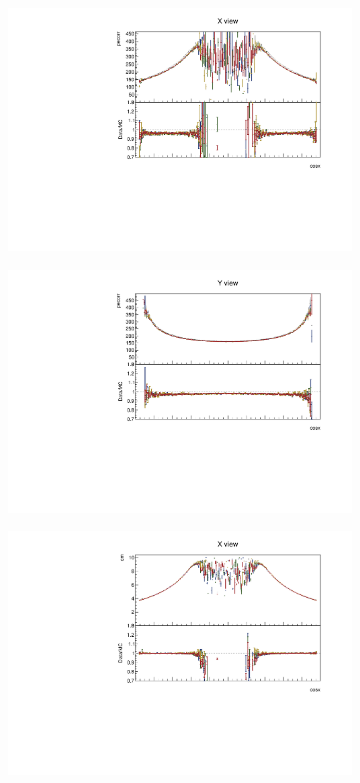 \documentclass[12pt,a4paper]{article}
\begin{document}
\begin{figure}[h!]
\begin{subfigure}{0.5\textwidth}
  \end{subfigure}
  \begin{subfigure}{0.5\textwidth}
    \includegraphics[width=\linewidth]{PlotsAngularDistribution/pecorr_cosx_x.pdf}
  \end{subfigure}
  \begin{subfigure}{0.5\textwidth}
    \includegraphics[width=\linewidth]{PlotsAngularDistribution/pecorr_cosx_y.pdf}
  \end{subfigure}
  \begin{subfigure}{0.5\textwidth}
    \includegraphics[width=\linewidth]{PlotsAngularDistribution/cm_cosx_x.pdf}

\end{subfigure}
\end{figure}
\end{document}
